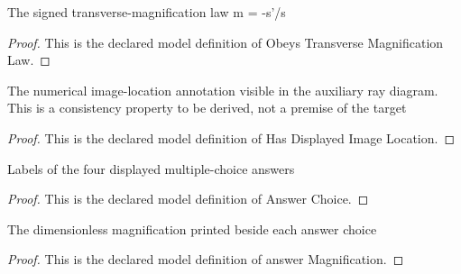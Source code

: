 \begin{definition}
  \label{def:physics:phyx-mini-0052:phyxminiproblems-problemphyxmini0052-obeystransversemagnificationlaw}
  The signed transverse-magnification law m = -s'/s
\end{definition}
\begin{proof}
  This is the declared model definition of Obeys Transverse Magnification Law.
\end{proof}
\begin{definition}
  \label{def:physics:phyx-mini-0052:phyxminiproblems-problemphyxmini0052-hasdisplayedimagelocation}
  The numerical image-location annotation visible in the auxiliary ray diagram. This is a consistency property to be derived, not a premise of the target
\end{definition}
\begin{proof}
  This is the declared model definition of Has Displayed Image Location.
\end{proof}
\begin{definition}
  \label{def:physics:phyx-mini-0052:phyxminiproblems-problemphyxmini0052-answerchoice}
  Labels of the four displayed multiple-choice answers
\end{definition}
\begin{proof}
  This is the declared model definition of Answer Choice.
\end{proof}
\begin{definition}
  \label{def:physics:phyx-mini-0052:phyxminiproblems-problemphyxmini0052-answermagnification}
  The dimensionless magnification printed beside each answer choice
\end{definition}
\begin{proof}
  This is the declared model definition of answer Magnification.
\end{proof}
